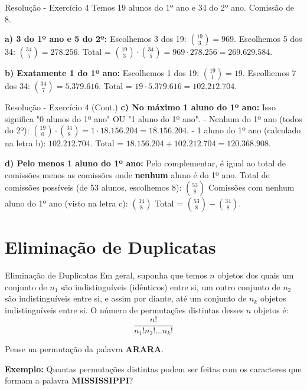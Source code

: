 \documentclass[9pt]{beamer}
\begin{document}
\begin{frame}{Resolução - Exercício 4}
Temos 19 alunos do 1º ano e 34 do 2º ano. Comissão de 8.

\vspace{0.2cm}

\textbf{a) 3 do 1º ano e 5 do 2º:}
Escolhemos 3 dos 19: $\binom{19}{3} = 969$.
Escolhemos 5 dos 34: $\binom{34}{5} = 278.256$.
Total = $\binom{19}{3} \cdot \binom{34}{5} = 969 \cdot 278.256 = 269.629.584$.

\vspace{0.2cm}

\textbf{b) Exatamente 1 do 1º ano:}
Escolhemos 1 dos 19: $\binom{19}{1} = 19$.
Escolhemos 7 dos 34: $\binom{34}{7} = 5.379.616$.
Total = $19 \cdot 5.379.616 = 102.212.704$.
\end{frame}

\begin{frame}{Resolução - Exercício 4 (Cont.)}
\textbf{c) No máximo 1 aluno do 1º ano:}
Isso significa "0 alunos do 1º ano" OU "1 aluno do 1º ano".
- Nenhum do 1º ano (todos do 2º): $\binom{19}{0} \cdot \binom{34}{8} = 1 \cdot 18.156.204 = 18.156.204$.
- 1 aluno do 1º ano (calculado na letra b): $102.212.704$.
Total = $18.156.204 + 102.212.704 = 120.368.908$.

\vspace{0.2cm}

\textbf{d) Pelo menos 1 aluno do 1º ano:}
Pelo complementar, é igual ao total de comissões menos as comissões onde \textbf{nenhum} aluno é do 1º ano.
Total de comissões possíveis (de 53 alunos, escolhemos 8):
$\binom{53}{8}$
Comissões com nenhum aluno do 1º ano (visto na letra c):
$\binom{34}{8}$
Total = $\binom{53}{8} - \binom{34}{8}$.
\end{frame}

\section{Eliminação de Duplicatas}
\begin{frame}{Eliminação de Duplicatas}
Em geral, suponha que temos $n$ objetos dos quais um conjunto de $n_1$ são indistinguíveis (idênticos) entre si, um outro conjunto de $n_2$ são indistinguíveis entre si, e assim por diante, até um conjunto de $n_k$ objetos indistinguíveis entre si. O número de permutações distintas desses $n$ objetos é:
\[
\frac{n!}{n_1! n_2! \dots n_k!}
\]
\vspace{0.3cm}

Pense na permutação da palavra \textbf{ARARA}.

\vspace{0.3cm}

\textbf{Exemplo:} Quantas permutações distintas podem ser feitas com os caracteres que formam a palavra \textbf{MISSISSIPPI}?
\end{frame}
\end{document}
